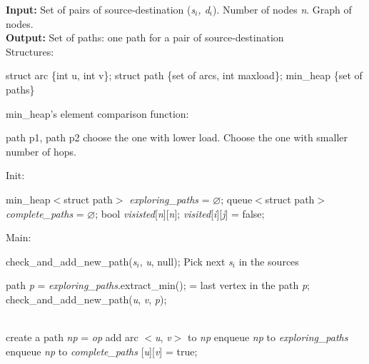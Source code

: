 \begin{algorithm}[!htp]
\textbf{Input:} Set of pairs of source-destination (\textit{s$_i$, d$_i$}). Number of nodes \textit{n}. Graph of nodes. \\
\textbf{Output:} Set of paths: one path for a pair of source-destination \\

Structures:
    \begin{algorithmic}
        \State struct arc \{int u, int v\};
        \State struct path \{set of arcs, int maxload\};
        \State min\_heap \{set of paths\}
    \end{algorithmic}

min\_heap's element comparison function:
    \begin{algorithmic}
         {path p1, path p2}
                \State choose the one with lower load.
                \State Choose the one with smaller number of hops.
            \EndIf
        \EndFunction
    \end{algorithmic}

Init:
    \begin{algorithmic}
	\State min\_heap$<$struct path$>$ \textit{exploring\_paths} = $\varnothing$;
	\State queue$<$struct path$>$ \textit{complete\_paths} = $\varnothing$;
	\State bool \textit{visisted}[\textit{n}][\textit{n}];
	    \State \textit{visited}[{\it i}][{\it j}] = false;
	\EndFor
    \end{algorithmic}
Main:

\begin{algorithmic}

	\State check\_and\_add\_new\_path({\it s}$_i$, \textit{u}, null);
	\State Pick next \textit{s$_i$} in the sources
    \EndWhile

	\State path \textit{p} = \textit{exploring\_paths}.extract\_min();
	 = last vertex in the path {\it p};
	    \State check\_and\_add\_new\_path({\it u}, \textit{v}, {\it p});
	\EndFor
    \EndWhile

    \EndFunction
\\
	    \State create a path \textit{np} = {\it op}
	    \State add arc $<$\textit{u}, \textit{v}$>$ to \textit{np}
	    \State enqueue \textit{np} to \textit{exploring\_paths}
	        \State enqueue \textit{np} to \textit{complete\_paths}
            \EndIf
	    [\textit{u}][\textit{v}] = true;
	\EndIf
    \EndFunction
\end{algorithmic}


\end{algorithm}
